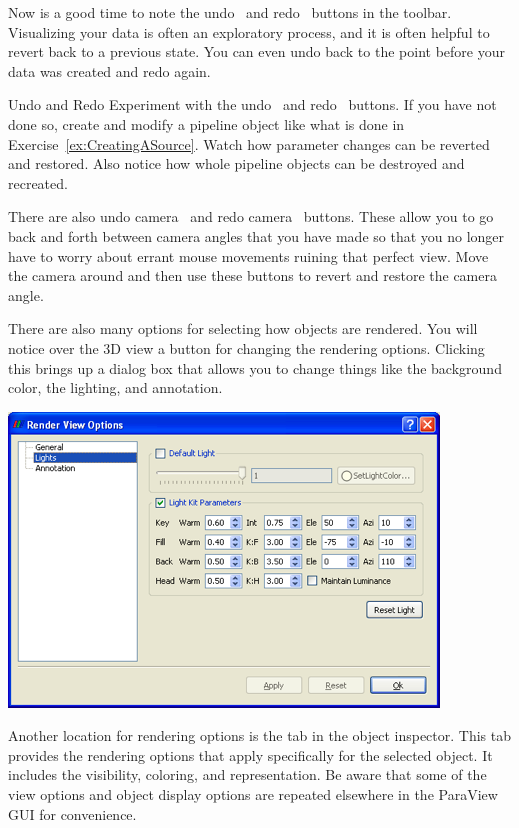 Now is a good time to note the undo~ and
redo~ buttons in the toolbar.  Visualizing your data is
often an exploratory process, and it is often helpful to revert back to a
previous state.  You can even undo back to the point before your data was
created and redo again.

\begin{exercise}{Undo and Redo}
  \label{ex:UndoAndRedo}%
  Experiment with the undo~ and redo~
  buttons.  If you have not done so, create and modify a pipeline object
  like what is done in Exercise~\ref{ex:CreatingASource}.  Watch how
  parameter changes can be reverted and restored.  Also notice how whole
  pipeline objects can be destroyed and recreated.

  There are also undo camera~ and redo
  camera~ buttons.  These allow you to go back and
  forth between camera angles that you have made so that you no longer have
  to worry about errant mouse movements ruining that perfect view.  Move
  the camera around and then use these buttons to revert and restore the
  camera angle.
\end{exercise}

There are also many options for selecting how objects are rendered.  You
will notice over the 3D view a  button for changing the
rendering options.  Clicking this brings up a dialog box that allows you to
change things like the background color, the lighting, and annotation.

\begin{inlinefig}
  \includegraphics[width=\scw]{images/RenderViewOptions}
\end{inlinefig}

Another location for rendering options is the  tab in the
object inspector.  This tab provides the rendering options that apply
specifically for the selected object.  It includes the visibility,
coloring, and representation.  Be aware that some of the view options and
object display options are repeated elsewhere in the ParaView GUI for
convenience.

